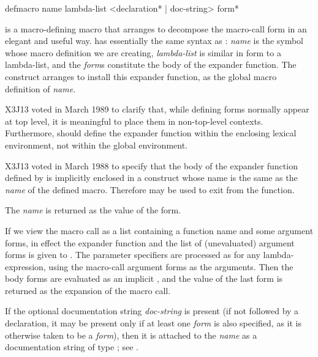 \begin{defmac}
defmacro name lambda-list <{declaration}* | doc-string> {form}*

 is a macro-defining macro that
arranges to decompose the macro-call form in an elegant and useful way.
 has essentially the same syntax as : \emph{name} is the
symbol whose macro definition we are creating, \emph{lambda-list} is similar in
form to a lambda-list, and
the \emph{form\/}s constitute the body of the expander function.
The  construct arranges to install this expander function,
as the global macro definition of \emph{name}.

\begin{newer}
X3J13 voted in March 1989 
to clarify that, while defining forms normally appear at top level,
it is meaningful to place them in non-top-level contexts.
Furthermore,  should define the expander function
within the enclosing lexical environment, not within the global
environment.
\end{newer}

\begin{newer}
X3J13 voted in March 1988 
to specify that the body of the expander function defined
by  is implicitly enclosed in a  construct
whose name is the same as the \emph{name} of the defined macro.
Therefore  may be used to exit from the function.
\end{newer}

The \emph{name} is returned
as the value of the  form.

If we view the 
macro call as a list containing a function name and some argument forms,
in effect the expander function and the list of (unevaluated) argument
forms is given to .
The parameter specifiers are processed as for any lambda-expression,
using the macro-call argument forms as the arguments.
Then the body forms are evaluated
as an implicit , and the value of the last form
is returned as the expansion of the macro call.

If the optional documentation string \emph{doc-string} is present (if not
followed by a declaration, it may be
present only if at least one \emph{form} is also specified, as it is
otherwise taken to be a \emph{form}), then it is attached to the \emph{name}
as a documentation string of type ; see .


\end{defmac}
